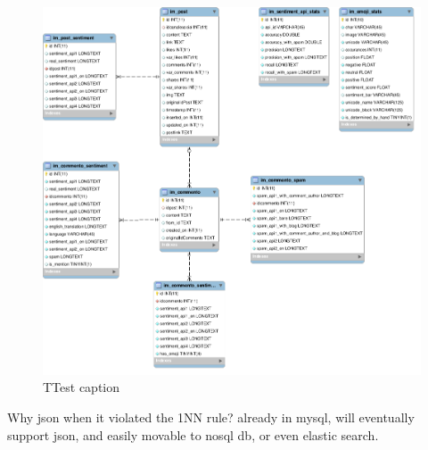 \begin{figure}[ht]
	\includegraphics[width=1.2\textwidth]{04-framework/01-design/Images/DB_schema.png}
	\caption[Test caption]{TTest caption \label{fig:test-caption}}
\end{figure}


Why json when it violated the 1NN rule? already in mysql, will eventually support json, and easily movable to nosql db, or even elastic search. 